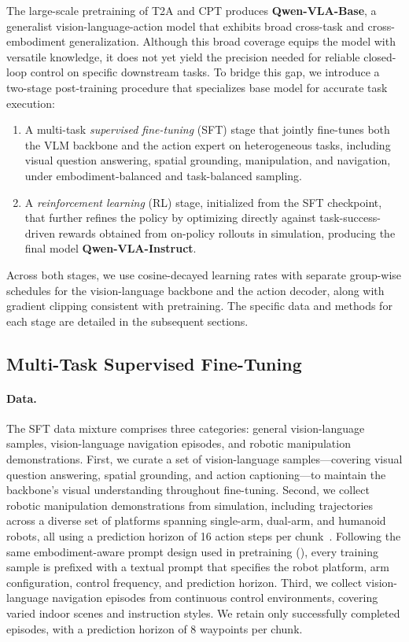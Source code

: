 \documentclass{article}
\begin{document}
The large-scale pretraining of T2A and CPT produces \textbf{Qwen-VLA-Base}, a generalist vision-language-action model that exhibits broad cross-task and cross-embodiment generalization.
Although this broad coverage equips the model with versatile knowledge, it does not yet yield the precision needed for reliable closed-loop control on specific downstream tasks.
To bridge this gap, we introduce a two-stage post-training procedure that specializes base model for accurate task execution:
\begin{enumerate}[label=(\roman*),nosep]
    \item A multi-task \emph{supervised fine-tuning} (SFT) stage that jointly fine-tunes both the VLM backbone and the action expert on heterogeneous tasks, including visual question answering, spatial grounding, manipulation, and navigation, under embodiment-balanced and task-balanced sampling.
    \item A \emph{reinforcement learning} (RL) stage, initialized from the SFT checkpoint, that further refines the policy by optimizing directly against task-success-driven rewards obtained from on-policy rollouts in simulation, producing the final model \textbf{Qwen-VLA-Instruct}.
\end{enumerate}
Across both stages, we use cosine-decayed learning rates with separate group-wise schedules for the vision-language backbone and the action decoder, along with gradient clipping consistent with pretraining.
The specific data and methods for each stage are detailed in the subsequent sections.


\subsection{Multi-Task Supervised Fine-Tuning}
\label{sec:sft}


\paragraph{Data.}
The SFT data mixture comprises three categories: general vision-language samples, vision-language navigation episodes, and robotic manipulation demonstrations. 
%
First, we curate a set of vision-language samples---covering visual question answering, spatial grounding, and action captioning---to maintain the backbone’s visual understanding throughout fine-tuning. 
%
Second, we collect robotic manipulation demonstrations from simulation, including trajectories across a diverse set of platforms spanning single-arm, dual-arm, and humanoid robots, all using a prediction horizon of 16 action steps per chunk~\citep{community2026starvla}.
%
Following the same embodiment-aware prompt design used in pretraining (), every training sample is prefixed with a textual prompt that specifies the robot platform, arm configuration, control frequency, and prediction horizon.
%
Third, we collect vision-language navigation episodes from continuous control environments, covering varied indoor scenes and instruction styles. We retain only successfully completed episodes, with a prediction horizon of 8 waypoints per chunk.
\end{document}
